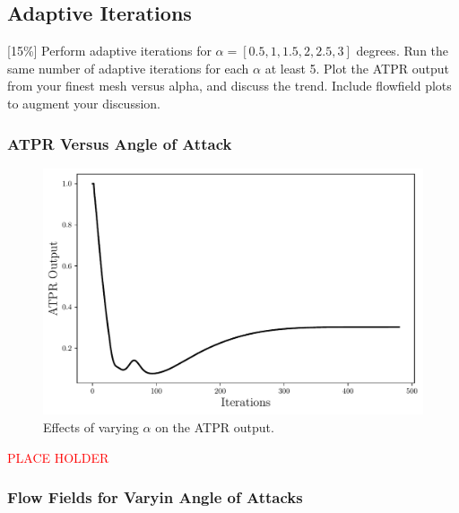 \pagebreak
\subsection{Adaptive Iterations}
[15\%] Perform adaptive iterations for $\alpha = [0.5, 1, 1.5, 2, 2.5, 3]$ degrees. Run the same number of adaptive iterations for each $\alpha$ at least 5. Plot the ATPR output from your finest mesh versus alpha, and discuss the trend. Include flowfield plots to augment your discussion.

\subsubsection{ATPR Versus Angle of Attack}
\begin{figure}[h]
    \centering
    \includegraphics[width = 0.9\linewidth]{rep/q5/ATPR.pdf}
    \caption[ATPR and Angle of Attack]{Effects of varying $\alpha$ on the ATPR output.}
    \label{fig:aoa_ATPR}
\end{figure}
\textcolor{red}{\large PLACE HOLDER}

\pagebreak
\subsubsection{Flow Fields for Varyin Angle of Attacks}

